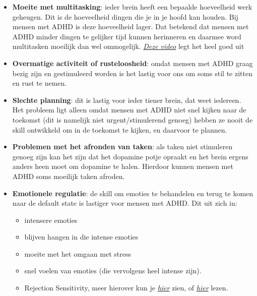 \begin{itemize}
                        \item \textbf{Moeite met multitasking}: 
                            ieder brein heeft een bepaalde hoeveelheid werk geheugen. Dit is de hoeveelheid dingen die je in je hoofd kan houden. Bij mensen met ADHD is deze hoeveelheid lager. Dat betekend dat mensen met ADHD minder dingen te gelijker tijd kunnen herinneren en daarmee word multitasken moeilijk dan wel ommogelijk. \emph{\hyperlink{https://www.youtube.com/watch?v=HszXKZO_H18&ab_channel=HowtoADHD}{Deze video}}\cite{ADHD-video-working-memory} legt het heel goed uit
                        
                        \item \textbf{Overmatige activiteit of rusteloosheid}: 
                            omdat mensen met ADHD graag bezig zijn en gestimuleerd worden is het lastig voor ons om soms stil te zitten en rust te nemen.
                        
                        \item \textbf{Slechte planning}: 
                            dit is lastig voor ieder tiener brein, dat weet iedereen. Het probleem ligt alleen omdat mensen met ADHD niet snel kijken naar de toekomst (dit is namelijk niet urgent/stimulerend genoeg) hebben ze nooit de skill ontwikkeld om in de toekomst te kijken, en daarvoor te plannen. 
                        
                        \item \textbf{Problemen met het afronden van taken}: 
                            als taken niet stimuleren genoeg zijn kan het zijn dat het dopamine potje opraakt en het brein ergens anders heen moet om dopamine te halen. Hierdoor kunnen mensen met ADHD soms moeilijk taken afroden.
                        
                        \item \textbf{Emotionele regulatie}: 
                            de skill om emoties te behandelen en terug te komen naar de default state is lastiger voor mensen met ADHD. Dit uit zich in:
                            \begin{itemize}
                                \item intensere emoties
                                \item blijven hangen in die intense emoties
                                \item moeite met het omgaan met stress
                                \item snel voelen van emoties (die vervolgens heel intense zijn). 
                                \item Rejection Sensitivity, meer hierover kun je \hyperlink{https://www.youtube.com/watch?v=ZQ44ynEjsHQ&ab_channel=KatiMorton}{\emph{hier}}\cite{ADHD-video-rejection-sensitivity} zien, of \hyperlink{https://my.clevelandclinic.org/health/diseases/24099-rejection-sensitive-dysphoria-rsd}{\emph{hier}} lezen\cite{ADHD-rejection-sensitivity}.
                            \end{itemize}
                \end{itemize}
                
